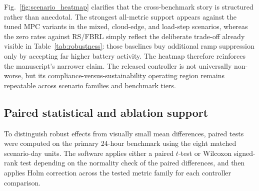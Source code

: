 \documentclass[preprint,12pt]{elsarticle}
\begin{document}
Fig.~\ref{fig:scenario_heatmap} clarifies that the cross-benchmark story is structured rather than anecdotal. The strongest all-metric support appears against the tuned MPC variants in the mixed, cloud-edge, and load-step scenarios, whereas the zero rates against RS/FBRL simply reflect the deliberate trade-off already visible in Table~\ref{tab:robustness}: those baselines buy additional ramp suppression only by accepting far higher battery activity. The heatmap therefore reinforces the manuscript's narrower claim. The released controller is not universally non-worse, but its compliance-versus-sustainability operating region remains repeatable across scenario families and benchmark tiers.

\subsection*{Paired statistical and ablation support}
To distinguish robust effects from visually small mean differences, paired tests were computed on the primary 24-hour benchmark using the eight matched scenario-day units. The software applies either a paired $t$-test or Wilcoxon signed-rank test depending on the normality check of the paired differences, and then applies Holm correction across the tested metric family for each controller comparison.

\begin{table}[H]
\centering
\caption{Selected paired statistics on the 24-hour primary benchmark. $\Delta$ denotes Proposed minus baseline, so negative values are favorable for metrics where lower is better.}
\label{tab:paired_select}
\footnotesize
\setlength{\tabcolsep}{3pt}
\end{table}
\end{document}
